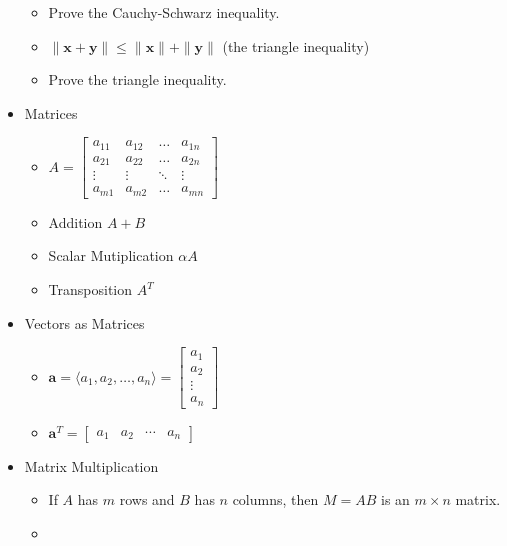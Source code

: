 \documentclass[11pt]{article}
\theoremstyle{plain}
\theoremstyle{definition}
\theoremstyle{remark}
\newcommand{\vect}[1]{\mathbf{#1}}
\newcommand{\<}{\langle}
\renewcommand{\>}{\rangle}
\begin{document}
\begin{itemize}
\begin{itemize}
      \item Prove the Cauchy-Schwarz inequality.
      \item
        \(
          \|\vect{x}+\vect{y}\|
            \leq
          \|\vect{x}\|+\|\vect{y}\|
        \)
        (the triangle inequality)
      \item Prove the triangle inequality.
    \end{itemize}
  \item Matrices
    \begin{itemize}
      \item
        \(
          A
            =
          \begin{bmatrix}
            a_{11} & a_{12} & \dots  & a_{1n} \\
            a_{21} & a_{22} & \dots  & a_{2n} \\
            \vdots & \vdots & \ddots & \vdots \\
            a_{m1} & a_{m2} & \dots  & a_{mn}
          \end{bmatrix}
        \)
      \item Addition \(A+B\)
      \item Scalar Mutiplication \(\alpha A\)
      \item Transposition \(A^T\)
    \end{itemize}
  \item Vectors as Matrices
    \begin{itemize}
      \item
        \(
          \vect{a}=\<a_1,a_2,\dots,a_n\>
            =
          \begin{bmatrix}
            a_{1}  \\
            a_{2}  \\
            \vdots \\
            a_{n}
          \end{bmatrix}
        \)
      \item
        \(
          \vect{a}^T
            =
          \begin{bmatrix}
            a_{1} & a_{2} & \cdots & a_{n}
          \end{bmatrix}
        \)
    \end{itemize}
  \item Matrix Multiplication
    \begin{itemize}
      \item
        If \(A\) has \(m\) rows and \(B\) has \(n\) columns,
        then \(M=AB\) is an \(m\times n\) matrix.
      \item

\end{itemize}
\end{itemize}
\end{document}
